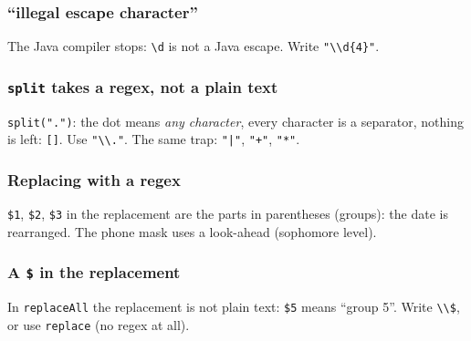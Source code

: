 \documentclass[aspectratio=169,10pt,compress]{beamer}
\begin{document}
\begin{frame}[t,fragile] \frametitle{``illegal escape character''}

  \vspace{0.1em}
  \small
  The Java compiler stops: \texttt{\textbackslash d} is not a Java escape. Write \texttt{"\textbackslash\textbackslash d\{4\}"}.
\end{frame}





\begin{frame}[t,fragile] \frametitle{\texttt{split} takes a regex, not a plain text}

  \vspace{0.2em}
  \small \texttt{split(".")}: the dot means \emph{any character}, every character is a separator, nothing is left: \texttt{[]}. Use \texttt{"\textbackslash\textbackslash ."}. The same trap: \texttt{"|"}, \texttt{"+"}, \texttt{"*"}.
\end{frame}





\begin{frame}[t,fragile] \frametitle{Replacing with a regex}

  \vspace{0.2em}
  \small \texttt{\$1}, \texttt{\$2}, \texttt{\$3} in the replacement are the parts in parentheses (groups): the date is rearranged.
  The phone mask uses a look-ahead (sophomore level).
\end{frame}




\begin{frame}[t,fragile] \frametitle{A \texttt{\$} in the replacement}

  \vspace{0.2em}
  \small In \texttt{replaceAll} the replacement is not plain text: \texttt{\$5} means ``group 5''. Write \texttt{\textbackslash\textbackslash\$}, or use \texttt{replace} (no regex at all).
\end{frame}
\end{document}

